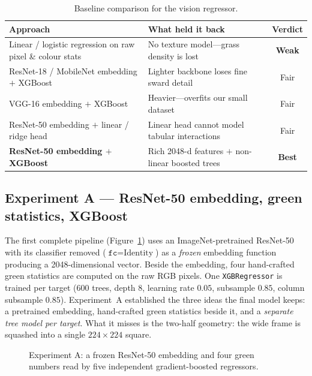 \documentclass[11pt,a4paper]{article}
\begin{document}
\begin{table}[h]
\centering\small
\caption{Baseline comparison for the vision regressor.}
\label{tab:baselines}
\begin{tabular}{p{6.2cm}p{6.0cm}c}
\toprule
\textbf{Approach} & \textbf{What held it back} & \textbf{Verdict}\\
\midrule
Linear / logistic regression on raw pixel \& colour stats & No texture model---grass density is lost & \textcolor{terra}{\textbf{Weak}}\\
ResNet-18 / MobileNet embedding $+$ XGBoost & Lighter backbone loses fine sward detail & Fair\\
VGG-16 embedding $+$ XGBoost & Heavier---overfits our small dataset & Fair\\
ResNet-50 embedding $+$ linear / ridge head & Linear head cannot model tabular interactions & Fair\\
\textbf{ResNet-50 embedding $+$ XGBoost} & Rich 2048-d features $+$ non-linear boosted trees & \textcolor{ochre}{\textbf{Best}}\\
\bottomrule
\end{tabular}
\end{table}

\subsection{Experiment A --- ResNet-50 embedding, green statistics, XGBoost}
The first complete pipeline (Figure~\ref{fig:expA}) uses an ImageNet-pretrained ResNet-50 with its
classifier removed ($\texttt{fc}=\text{Identity}$) as a \emph{frozen} embedding function producing
a 2048-dimensional vector. Beside the embedding, four hand-crafted green statistics are computed
on the raw RGB pixels. One \texttt{XGBRegressor} is trained per target (600 trees, depth 8,
learning rate $0.05$, subsample $0.85$, column subsample $0.85$). Experiment~A established the
three ideas the final model keeps: a pretrained embedding, hand-crafted green statistics beside it,
and a \emph{separate tree model per target}. What it misses is the two-half geometry: the wide
frame is squashed into a single $224\times224$ square.

\begin{figure}[h]
\centering
{}
\caption{Experiment A: a frozen ResNet-50 embedding and four green numbers read by five
independent gradient-boosted regressors.}
\label{fig:expA}
\end{figure}
\end{document}
